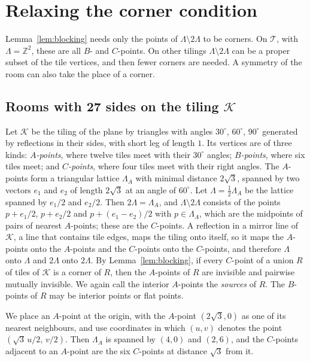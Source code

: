 \documentclass[11pt,a4paper]{article}
\theoremstyle{plain}
\theoremstyle{definition}
\theoremstyle{remark}
\newcommand{\Z}{\mathbb{Z}}
\newcommand{\T}{\mathcal{T}}
\newcommand{\K}{\mathcal{K}}
\newcommand{\dg}{^\circ}
\numberwithin{equation}{section}
\begin{document}
\section{Relaxing the corner condition}\label{sec:relax}

Lemma~\ref{lem:blocking} needs only the points of $\Lambda\setminus2\Lambda$ to be corners. On $\T$, with $\Lambda=\Z^2$, these are all $B$- and $C$-points. On other tilings $\Lambda\setminus2\Lambda$ can be a proper subset of the tile vertices, and then fewer corners are needed. A symmetry of the room can also take the place of a corner.

\subsection{Rooms with 27 sides on the tiling \texorpdfstring{$\K$}{K}}\label{sec:27}
Let $\K$ be the tiling of the plane by triangles with angles $30\dg$, $60\dg$, $90\dg$ generated by reflections in their sides, with short leg of length $1$. Its vertices are of three kinds: \emph{$A$-points}, where twelve tiles meet with their $30\dg$ angles; \emph{$B$-points}, where six tiles meet; and \emph{$C$-points}, where four tiles meet with their right angles. The $A$-points form a triangular lattice $\Lambda_A$ with minimal distance $2\sqrt3$, spanned by two vectors $e_1$ and $e_2$ of length $2\sqrt3$ at an angle of $60\dg$. Let $\Lambda=\tfrac12\Lambda_A$ be the lattice spanned by $e_1/2$ and $e_2/2$. Then $2\Lambda=\Lambda_A$, and $\Lambda\setminus2\Lambda$ consists of the points $p+e_1/2$, $p+e_2/2$ and $p+(e_1-e_2)/2$ with $p\in\Lambda_A$, which are the midpoints of pairs of nearest $A$-points; these are the $C$-points. A reflection in a mirror line of $\K$, a line that contains tile edges, maps the tiling onto itself, so it maps the $A$-points onto the $A$-points and the $C$-points onto the $C$-points, and therefore $\Lambda$ onto $\Lambda$ and $2\Lambda$ onto $2\Lambda$. By Lemma~\ref{lem:blocking}, if every $C$-point of a union $R$ of tiles of $\K$ is a corner of $R$, then the $A$-points of $R$ are invisible and pairwise mutually invisible. We again call the interior $A$-points the \emph{sources} of $R$. The $B$-points of $R$ may be interior points or flat points.

We place an $A$-point at the origin, with the $A$-point $(2\sqrt3,0)$ as one of its nearest neighbours, and use coordinates in which $(u,v)$ denotes the point $(\sqrt3\,u/2,\,v/2)$. Then $\Lambda_A$ is spanned by $(4,0)$ and $(2,6)$, and the $C$-points adjacent to an $A$-point are the six $C$-points at distance $\sqrt3$ from it.
\end{document}
